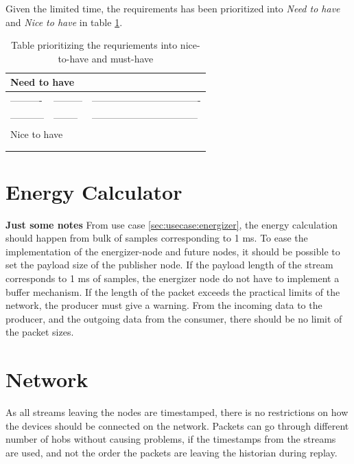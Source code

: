 Given the limited time, the requirements has been prioritized into \textit{Need to have} and \textit{Nice to have} in table \ref{sec:analysis:historian:tablefeatures}.
\begin{table}[h!]
\centering
\caption{Table prioritizing the requriements into nice-to-have and must-have}
\label{sec:analysis:historian:tablefeatures}
\begin{tabular}{l|l|l}

\multicolumn{3}{l}{Need to have}              \\ \hline
----------  & --------- & ---------------------------------- \\ \hline
----------- & --------  & --------------------------------- \\ \hline
\multicolumn{3}{l}{Nice to have}              \\ \hline
            &           &                       \\ \hline
            &           &                       \\ \hline
\end{tabular}
\end{table}

\section{Energy Calculator}
\textbf{Just some notes}
From use case \ref{sec:usecase:energizer}, the energy calculation should happen from bulk of samples corresponding to 1 ms. To ease the implementation of the energizer-node and future nodes, it should be possible to set the payload size of the publisher node. If the payload length of the stream corresponds to 1 ms of samples, the energizer node do not have to implement a buffer mechanism. If the length of the packet exceeds the practical limits of the network, the producer must give a warning. From the incoming data to the producer, and the outgoing data from the consumer, there should be no limit of the packet sizes.

\section{Network}
As all streams leaving the nodes are timestamped, there is no restrictions on how the devices should be connected on the network. Packets can go through different number of hobs without causing problems, if the timestamps from the streams are used, and not the order the packets are leaving the historian during replay.

